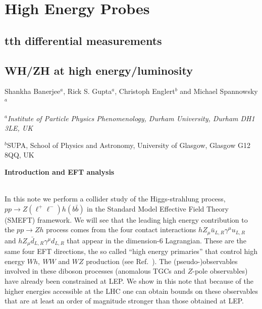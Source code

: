 \documentclass[../report.tex]{subfiles}
\begin{document}
\section{High Energy Probes}

\subsection{tth differential measurements}
\subsection{WH/ZH at high energy/luminosity}
\begin{center}
\bigskip\vspace{1cm}
{Shankha Banerjee$^{a}$,  Rick S. Gupta$^{a}$,  Christoph Englert$^{b}$ and Michael Spannowsky$^{a}$}
\centerline{$^a${\it Institute of Particle Physics Phenomenology, Durham University, Durham DH1 3LE, UK}}
\centerline{$^b${SUPA, School of Physics and Astronomy, University of Glasgow, Glasgow G12 8QQ, UK}}
\end{center}
\large{\bf Introduction and EFT analysis} \\ \\

\normalsize


In this note we perform a collider study of the Higgs-strahlung process, $pp \to Z(\ell^+ \ell^-)h(b\bar 
b)$ in the Standard Model Effective Field Theory (SMEFT) framework. We will see that the leading high energy contribution to the $pp \to Zh$ process comes from the four 
contact interactions  $hZ_\mu \bar{u}_{L,R} \gamma^\mu u_{L,R}$ and $hZ_\mu \bar{d}_{L,R} \gamma^\mu 
d_{L,R}$ that appear in the dimension-6 Lagrangian. These are the same four EFT directions, the so called ``high 
energy primaries'' that control  high energy $Wh,~WW$ and $WZ$ production (see Ref.~\cite{Franceschini:2017xkh}). The (pseudo-)observables involved in these diboson processes (anomalous TGCs and $Z$-pole observables)  have already been constrained at LEP.  We show in this note that    because of the higher  energies accessible at the LHC one can obtain bounds on these observables that are at least an order of magnitude stronger than those obtained at LEP.
\end{document}
